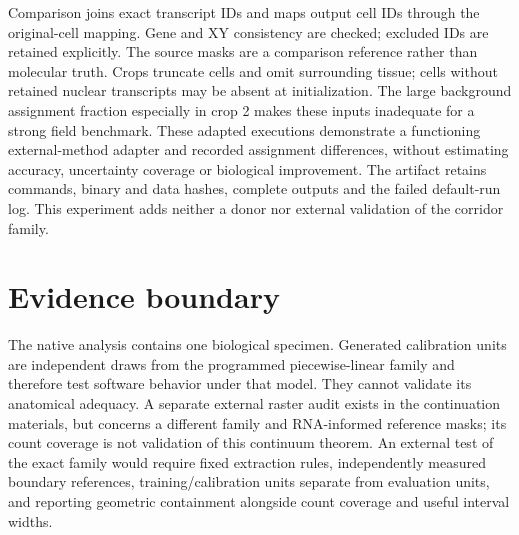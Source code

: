 \documentclass[10pt,letterpaper]{article}
\begin{document}
Comparison joins exact transcript IDs and maps output cell IDs through the original-cell mapping. Gene and XY consistency are checked; excluded IDs are retained explicitly. The source masks are a comparison reference rather than molecular truth. Crops truncate cells and omit surrounding tissue; cells without retained nuclear transcripts may be absent at initialization. The large background assignment fraction especially in crop 2 makes these inputs inadequate for a strong field benchmark. These adapted executions demonstrate a functioning external-method adapter and recorded assignment differences, without estimating accuracy, uncertainty coverage or biological improvement. The artifact retains commands, binary and data hashes, complete outputs and the failed default-run log. This experiment adds neither a donor nor external validation of the corridor family.

\section{Evidence boundary}
The native analysis contains one biological specimen. Generated calibration units are independent draws from the programmed piecewise-linear family and therefore test software behavior under that model. They cannot validate its anatomical adequacy. A separate external raster audit exists in the continuation materials, but concerns a different family and RNA-informed reference masks; its count coverage is not validation of this continuum theorem. An external test of the exact family would require fixed extraction rules, independently measured boundary references, training/calibration units separate from evaluation units, and reporting geometric containment alongside count coverage and useful interval widths.
\end{document}
